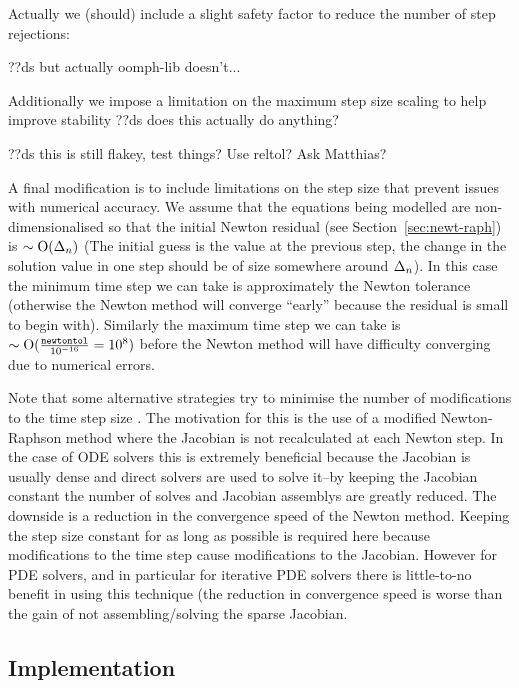 Actually we (should) include a slight safety factor to reduce the number of step rejections:

??ds but actually oomph-lib doesn't...


Additionally we impose a limitation on the maximum step size scaling to help improve stability ??ds does this actually do anything?


??ds this is still flakey, test things? Use reltol? Ask Matthias?

A final modification is to include limitations on the step size that prevent issues with numerical accuracy.
We assume that the equations being modelled are non-dimensionalised so that the initial Newton residual (see Section~\ref{sec:newt-raph}) is $\sim \text{O}(\Delta_{n})$ (The initial guess is the value at the previous step, the change in the solution value in one step should be of size somewhere around $\Delta_{n}$).
In this case the minimum time step we can take is approximately the Newton tolerance (otherwise the Newton method will converge ``early'' because the residual is small to begin with).
Similarly the maximum time step we can take is $\sim \text{O}(\frac{\texttt{newtontol}}{10^{-16}} = 10^{8})$ before the Newton method will have difficulty converging due to numerical errors.


Note that some alternative strategies try to minimise the number of modifications to the time step size\cite[chap. 6]{Iserles2009} \cite[Sec. 2.1]{cvode-manual}.
The motivation for this is the use of a modified Newton-Raphson method where the Jacobian is not recalculated at each Newton step.
In the case of ODE solvers this is extremely beneficial because the Jacobian is usually dense and direct solvers are used to solve it--by keeping the Jacobian constant the number of solves and Jacobian assemblys are greatly reduced.
The downside is a reduction in the convergence speed of the Newton method.
Keeping the step size constant for as long as possible is required here because modifications to the time step cause modifications to the Jacobian.
However for PDE solvers, and in particular for iterative PDE solvers there is little-to-no benefit in using this technique (the reduction in convergence speed is worse than the gain of not assembling/solving the sparse Jacobian\cite[pg. 128]{Iserles2009}.


\subsection{Implementation}

